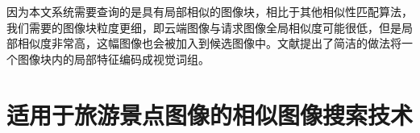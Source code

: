 因为本文系统需要查询的是具有局部相似的图像块，相比于其他相似性匹配算法，我们需要的图像块粒度更细，即云端图像与请求图像全局相似度可能很低，但是局部相似度非常高，这幅图像也会被加入到候选图像中。文献\cite{Dai:2012vn}提出了简洁的做法将一个图像块内的局部特征编码成视觉词组。

\section{适用于旅游景点图像的相似图像搜索技术}

\ifx\usechapbib\empty
\nocite{BSTcontrol}


\fi